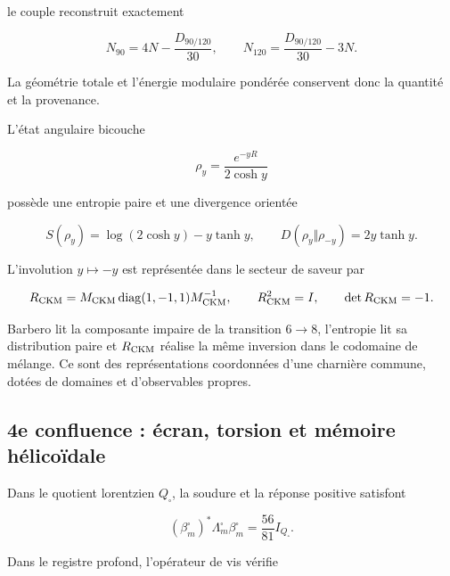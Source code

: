 le couple reconstruit exactement

\begin{equation}
 N_{90}=4N-\frac{D_{90/120}}{30},
 \qquad
 N_{120}=\frac{D_{90/120}}{30}-3N.
 \label{rm:eq:confluence-sector-reconstruction}
\end{equation}

La géométrie totale et l’énergie modulaire pondérée conservent donc la quantité et la provenance.

L’état angulaire bicouche

\begin{equation}
 \rho_y=\frac{e^{-yR}}{2\cosh y}
 \label{rm:eq:confluence-rhoy}
\end{equation}

possède une entropie paire et une divergence orientée

\begin{equation}
 S(\rho_y)=\log(2\cosh y)-y\tanh y,
 \qquad
 D(\rho_y\Vert\rho_{-y})=2y\tanh y.
 \label{rm:eq:confluence-info-orientation}
\end{equation}

L’involution \(y\mapsto-y\) est représentée dans le secteur de saveur par

\begin{equation}
 R_{\rm CKM}
 =M_{\rm CKM}\operatorname{diag}(1,-1,1)M_{\rm CKM}^{-1},
 \qquad
 R_{\rm CKM}^2=I,
 \qquad
 \det R_{\rm CKM}=-1.
 \label{rm:eq:confluence-rckm}
\end{equation}

Barbero lit la composante impaire de la transition \(6\to8\), l’entropie lit sa distribution paire et \(R_{\rm CKM}\) réalise la même inversion dans le codomaine de mélange. Ce sont des représentations coordonnées d’une charnière commune, dotées de domaines et d’observables propres.

\subsection{4e confluence : écran, torsion et mémoire hélicoïdale}

Dans le quotient lorentzien \(Q_{\square}\), la soudure et la réponse positive satisfont

\begin{equation}
 \boxed{
 (\beta_m^{\square})^*\Lambda_m^{\square}\beta_m^{\square}
 =\frac{56}{81}I_{Q_{\square}}.}
 \label{rm:eq:confluence-screen-energy}
\end{equation}

Dans le registre profond, l’opérateur de vis vérifie

